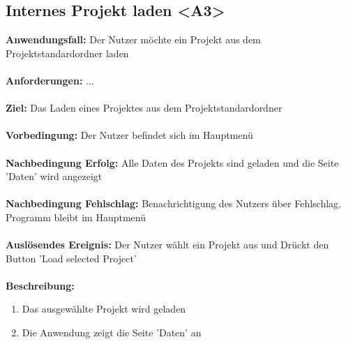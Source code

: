 \documentclass[parskip=full]{scrartcl} %
\begin{document}
\subsection*{Internes Projekt laden <A3>}
\textbf{Anwendungsfall:} Der Nutzer möchte ein Projekt aus dem Projektstandardordner laden\\\\
\textbf{Anforderungen:} ...\\\\
\textbf{Ziel:} Das Laden eines Projektes aus dem Projektstandardordner \\\\
\textbf{Vorbedingung:} Der Nutzer befindet sich im Hauptmenü  \\\\
\textbf{Nachbedingung Erfolg:} Alle Daten des Projekts sind geladen und die Seite 'Daten' wird angezeigt \\\\
\textbf{Nachbedingung Fehlschlag:} Benachrichtigung des Nutzers über Fehlschlag, Programm  bleibt im Hauptmenü \\\\
\textbf{Auslösendes Ereignis:}  Der Nutzer wählt ein Projekt aus und Drückt den Button 'Load selected Project' \\\\
\textbf{Beschreibung:}
\begin{enumerate}
    \item Das ausgewählte Projekt wird geladen
    \item Die Anwendung zeigt die Seite 'Daten' an
\end{enumerate}
\newpage
\end{document}
